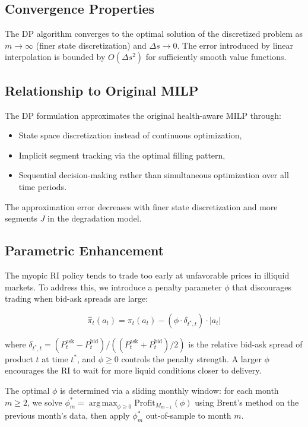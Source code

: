 \documentclass[10pt,twocolumn]{article}
\DeclareMathOperator*{\argmax}{arg\,max}
\begin{document}
\subsection{Convergence Properties}

The DP algorithm converges to the optimal solution of the discretized problem as $m \to \infty$ (finer state discretization) and $\Delta s \to 0$. The error introduced by linear interpolation is bounded by $O(\Delta s^2)$ for sufficiently smooth value functions.

\subsection{Relationship to Original MILP}

The DP formulation approximates the original health-aware MILP through:
\begin{itemize}
    \item State space discretization instead of continuous optimization,
    \item Implicit segment tracking via the optimal filling pattern,
    \item Sequential decision-making rather than simultaneous optimization over all time periods.
\end{itemize}

The approximation error decreases with finer state discretization and more segments $J$ in the degradation model.

\subsection{Parametric Enhancement}
The myopic RI policy tends to trade too early at unfavorable prices in illiquid markets. To address this, we introduce a penalty parameter $\phi$ that discourages trading when bid-ask spreads are large:

\begin{equation}
\hat{\pi}_t(a_t) = \pi_t(a_t) - (\phi \cdot \delta_{t^*,t}) \cdot |a_t|
\label{eq:parametric_enhancement}
\end{equation}

where $\delta_{t^*,t} = (P_t^{\text{ask}} - P_t^{\text{bid}})/((P_t^{\text{ask}} + P_t^{\text{bid}})/2)$ is the relative bid-ask spread of product $t$ at time $t^*$, and $\phi \geq 0$ controls the penalty strength. A larger $\phi$ encourages the RI to wait for more liquid conditions closer to delivery.

The optimal $\phi$ is determined via a sliding monthly window: for each month $m \geq 2$, we solve $\phi_m^* = \argmax_{\phi \geq 0} \text{Profit}_{M_{m-1}}(\phi)$ using Brent's method on the previous month's data, then apply $\phi_m^*$ out-of-sample to month $m$.
\end{document}
